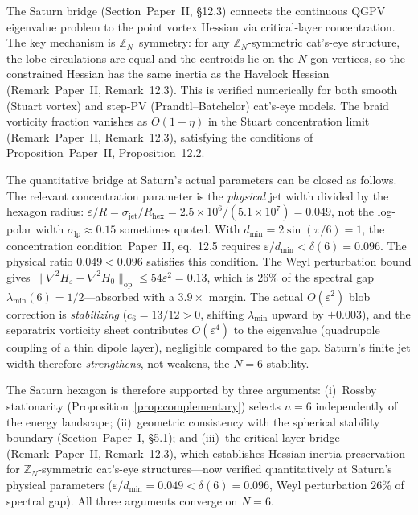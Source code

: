 The Saturn bridge (Section~Paper~II, \S12.3) connects the
continuous QGPV eigenvalue problem to the point vortex Hessian via
critical-layer concentration.  The key mechanism is
$\mathbb{Z}_N$~symmetry: for any $\mathbb{Z}_N$-symmetric cat's-eye
structure, the lobe circulations are equal and the centroids lie on
the $N$-gon vertices, so the constrained Hessian has the same inertia
as the Havelock Hessian (Remark~Paper~II, Remark~12.3).  This is verified
numerically for both smooth (Stuart vortex) and step-PV
(Prandtl--Batchelor) cat's-eye models.  The braid vorticity fraction
vanishes as $O(1{-}\eta)$ in the Stuart concentration limit
(Remark~Paper~II, Remark~12.3), satisfying the conditions of
Proposition~Paper~II, Proposition~12.2.

The quantitative bridge at Saturn's actual parameters can be closed
as follows.  The relevant concentration parameter is the
\emph{physical} jet width divided by the hexagon radius:
$\varepsilon/R = \sigma_{\mathrm{jet}}/R_{\mathrm{hex}}
= 2.5 \times 10^6/(5.1 \times 10^7) = 0.049$,
not the log-polar width $\sigma_{\mathrm{lp}} \approx 0.15$
sometimes quoted.  With $d_{\min} = 2\sin(\pi/6) = 1$, the
concentration condition~Paper~II, eq.~12.5 requires
$\varepsilon/d_{\min} < \delta(6) = 0.096$.  The physical ratio
$0.049 < 0.096$ satisfies this condition.
The Weyl perturbation bound gives
$\|\nabla^2\!H_\varepsilon - \nabla^2\!H_0\|_{\mathrm{op}}
\le 54\varepsilon^2 = 0.13$, which is $26\%$ of the spectral gap
$\lambda_{\min}(6) = 1/2$---absorbed with a $3.9\times$ margin.
The actual $O(\varepsilon^2)$ blob correction is \emph{stabilizing}
($c_6 = 13/12 > 0$, shifting $\lambda_{\min}$ upward by $+0.003$),
and the separatrix vorticity sheet contributes $O(\varepsilon^4)$
to the eigenvalue (quadrupole coupling of a thin dipole layer),
negligible compared to the gap.  Saturn's finite jet width therefore
\emph{strengthens}, not weakens, the $N = 6$ stability.

The Saturn hexagon is therefore supported by three arguments:
(i)~Rossby stationarity (Proposition~\ref{prop:complementary}) selects
$n = 6$ independently of the energy landscape;
(ii)~geometric consistency with the spherical stability boundary
(Section~Paper~I, \S5.1); and
(iii)~the critical-layer bridge (Remark~Paper~II, Remark~12.3), which
establishes Hessian inertia preservation for $\mathbb{Z}_N$-symmetric
cat's-eye structures---now verified quantitatively at Saturn's
physical parameters ($\varepsilon/d_{\min} = 0.049 < \delta(6) = 0.096$,
Weyl perturbation $26\%$ of spectral gap).  All three arguments
converge on $N = 6$.

